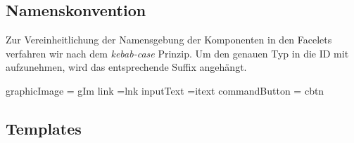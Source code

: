 \newcommand{\ftable}[1]{\begin{sidewaystable}
\begin{tabular}[H]{ |m{2cm}| m{3cm}| m{4cm}| m{6cm} |m{4cm}| m{2cm}| }
    \toprule
    \textbf{ID} & \textbf{Typ} & \textbf{Beschreibung} & \textbf{Binding} & \textbf{Constraints} & \textbf{Validator \newline Converter} \\
    \midrule
    #1
\end{tabular}
\end{sidewaystable}
}

\newcommand{\fentry}[6]{#1 & #2 & #3 & #4 & #5 & #6\\\hline}


\subsection{Namenskonvention}

Zur Vereinheitlichung der Namensgebung der Komponenten in den Facelets verfahren wir nach dem \emph{kebab-case} Prinzip. Um den genauen Typ in die ID mit aufzunehmen, wird das entsprechende Suffix angehängt.

 graphicImage = gIm link =lnk inputText =itext commandButton = cbtn

\subsection{Templates}


